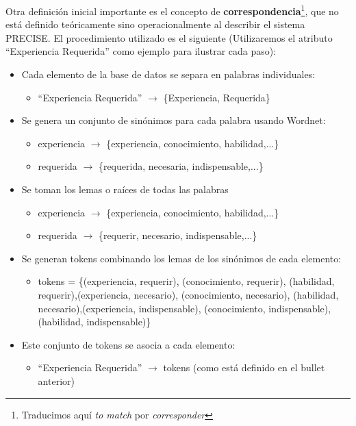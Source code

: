 Otra definición inicial importante es el concepto de \textbf{correspondencia}\footnote{Traducimos aquí \textit{to match} por \textit{corresponder}}, que no está definido teóricamente sino operacionalmente al describir el sistema PRECISE. El procedimiento utilizado es el siguiente (Utilizaremos el atributo “Experiencia Requerida” como ejemplo para ilustrar cada paso):

\begin{itemize}
  \item Cada elemento de la base de datos se separa en palabras individuales:
  \begin{itemize}
    \item “Experiencia Requerida” $\rightarrow$ \{Experiencia, Requerida\}
  \end{itemize}
  \item Se genera un conjunto de sinónimos para cada palabra usando Wordnet:
  \begin{itemize}
    \item experiencia $\rightarrow$ \{experiencia, conocimiento, habilidad,...\}
    \item requerida $\rightarrow$ \{requerida, necesaria, indispensable,...\}
  \end{itemize}
  \item Se toman los lemas o raíces de todas las palabras
    \begin{itemize}
      \item experiencia $\rightarrow$ \{experiencia, conocimiento, habilidad,...\}
      \item requerida $\rightarrow$ \{requerir, necesario, indispensable,...\}
  \end{itemize}
  \item Se generan tokens combinando los lemas de los sinónimos de cada elemento:
  \begin{itemize}
      \item tokens = \{(experiencia, requerir), (conocimiento, requerir), (habilidad, requerir),(experiencia, necesario), (conocimiento, necesario), (habilidad, necesario),(experiencia, indispensable), (conocimiento, indispensable), (habilidad, indispensable)\}
  \end{itemize}
  \item Este conjunto de tokens se asocia a cada elemento:
  \begin{itemize}
    \item “Experiencia Requerida” $\rightarrow$ tokens (como está definido en el bullet anterior)
  \end{itemize}
\end{itemize}

